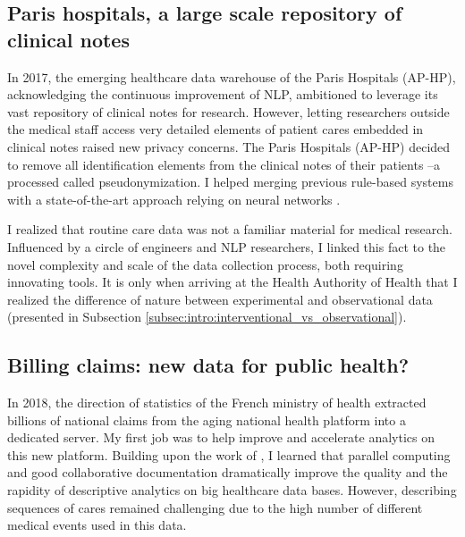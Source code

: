 \documentclass[french,12pt,twoside,a4paper]{book}
\begin{document}
\subsection{Paris hospitals, a large scale repository of clinical notes}

In 2017, the emerging healthcare data warehouse of the Paris Hospitals (AP-HP),
acknowledging the continuous improvement of NLP, ambitioned to leverage its vast
repository of clinical notes for research.
However, letting researchers outside the medical staff access very detailed
elements of patient cares embedded in clinical notes raised new privacy
concerns.
The Paris Hospitals (AP-HP) decided to remove all identification elements from
the clinical notes of their patients --a processed called pseudonymization. I
helped merging previous rule-based systems with a state-of-the-art approach
relying on neural networks \citep{dernoncourt2017identification,
  paris2019desidentification}.

I realized that routine care data was not a familiar material for medical
research. Influenced by a circle of engineers and NLP researchers, I linked this
fact to the novel complexity and scale of the data collection process, both
requiring innovating tools. It is only when arriving at the Health Authority of
Health that I realized the difference of nature between experimental and
observational data (presented in Subsection
\ref{subsec:intro:interventional_vs_observational}).

\subsection{Billing claims: new data for public health?}
%
In 2018, the direction of statistics of the French ministry of health extracted
billions of national claims from the aging national health platform into a
dedicated server.
%
My first job was to help improve and accelerate analytics on this new platform.
Building upon the work of \cite{bacry2020scalpel3}, I learned that parallel
computing and good collaborative documentation \citep{documentation_snds}
dramatically improve the quality and the rapidity of descriptive analytics on
big healthcare data bases. However, describing sequences of cares remained
challenging due to the high number of different medical events used in this
data.%
\end{document}
